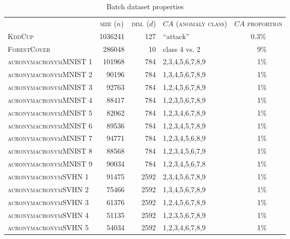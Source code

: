 \begin{table}[p]
	\caption{Batch dataset properties}
\begin{center}
	\small
	\begin{tabular}{lrrlc}
		\toprule 
		\addlinespace
		& \multicolumn{1}{c}{\textsc{size ($n$)}}  & \multicolumn{1}{c}{\textsc{dim. ($d$)}} & \multicolumn{1}{c}{\textsc{$CA$ (anomaly class)}} & \multicolumn{1}{c}{\textsc{$CA$ proportion}} \\ 
		\cmidrule(lr){2-2}\cmidrule(lr){3-3}\cmidrule(lr){4-4}\cmidrule(lr){5-5}
		\addlinespace
		\textsc{\textsc{KddCup}} & \num{1036241} & \num{127} & \enquote{attack}& 0.3\%\\
		\textsc{ForestCover} & \num{286048} & \num{10} & class 4 vs. 2 & ~~9\%\\
		\textsc{acronym{acronym{MNIST}} 1}	& \num{101968}	& \num{784} & 2,3,4,5,6,7,8,9 & ~~1\%\\
		\textsc{acronym{acronym{MNIST}} 2}	& \num{90196}	& \num{784} & 1,3,4,5,6,7,8,9 & ~~1\%\\
		\textsc{acronym{acronym{MNIST}} 3}	& \num{92763}	& \num{784} & 1,2,4,5,6,7,8,9 & ~~1\%\\
		\textsc{acronym{acronym{MNIST}} 4}	& \num{88417}	& \num{784} & 1,2,3,5,6,7,8,9 & ~~1\%\\
		\textsc{acronym{acronym{MNIST}} 5}	& \num{82062}	& \num{784} & 1,2,3,4,6,7,8,9 & ~~1\%\\
		\textsc{acronym{acronym{MNIST}} 6}	& \num{89536}	& \num{784} & 1,2,3,4,5,7,8,9 & ~~1\%\\
		\textsc{acronym{acronym{MNIST}} 7}	& \num{94771}	& \num{784} & 1,2,3,4,5,6,8,9 & ~~1\%\\
		\textsc{acronym{acronym{MNIST}} 8}	& \num{88568}	& \num{784} & 1,2,3,4,5,6,7,9 & ~~1\%\\
		\textsc{acronym{acronym{MNIST}} 9}	& \num{90034}	& \num{784} & 1,2,3,4,5,6,7,8 & ~~1\%\\
		\textsc{acronym{acronym{SVHN}} 1}	& \num{91475}	& \num{2592} & 2,3,4,5,6,7,8,9 & ~~1\%\\
		\textsc{acronym{acronym{SVHN}} 2}	& \num{75466}	& \num{2592} & 1,3,4,5,6,7,8,9 & ~~1\%\\
		\textsc{acronym{acronym{SVHN}} 3}	& \num{61376}	& \num{2592} & 1,2,4,5,6,7,8,9 & ~~1\%\\
		\textsc{acronym{acronym{SVHN}} 4}	& \num{51135}	& \num{2592} & 1,2,3,5,6,7,8,9 & ~~1\%\\
		\textsc{acronym{acronym{SVHN}} 5}	& \num{54034}	& \num{2592} & 1,2,3,4,6,7,8,9 & ~~1\%\\

\end{tabular}
\end{center}
\end{table}

